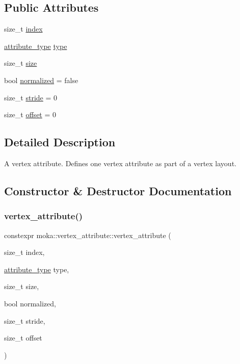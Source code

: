\subsection*{Public Attributes}
\begin{DoxyCompactItemize}
\item 
size\+\_\+t \mbox{\hyperlink{structmoka_1_1vertex__attribute_aabe27b67bd411d2845eae8d096d6547c}{index}}
\item 
\mbox{\hyperlink{namespacemoka_a1fe222f346eb65977e1069323023faa5}{attribute\+\_\+type}} \mbox{\hyperlink{structmoka_1_1vertex__attribute_aa8607ca1afa2836266900168844b6034}{type}}
\item 
size\+\_\+t \mbox{\hyperlink{structmoka_1_1vertex__attribute_a12e35fefbda322f7630d6366620ec6e5}{size}}
\item 
bool \mbox{\hyperlink{structmoka_1_1vertex__attribute_ab9bafa137212fbb874ac113f29297c8e}{normalized}} = false
\item 
size\+\_\+t \mbox{\hyperlink{structmoka_1_1vertex__attribute_ac14a60d2a9728b757d1b0f0bd09cbaa8}{stride}} = 0
\item 
size\+\_\+t \mbox{\hyperlink{structmoka_1_1vertex__attribute_a373fa56e1d1739964eb12c809a80f358}{offset}} = 0
\end{DoxyCompactItemize}


\subsection{Detailed Description}
A vertex attribute. Defines one vertex attribute as part of a vertex layout. 

\subsection{Constructor \& Destructor Documentation}
\mbox{\label{structmoka_1_1vertex__attribute_aa03afd5611da669788f8a779587708c2}} 
\subsubsection{\texorpdfstring{vertex\_attribute()}{vertex\_attribute()}}
{\footnotesize\ttfamily constexpr moka\+::vertex\+\_\+attribute\+::vertex\+\_\+attribute (\begin{DoxyParamCaption}\item[{size\+\_\+t}]{index,  }\item[{\mbox{\hyperlink{namespacemoka_a1fe222f346eb65977e1069323023faa5}{attribute\+\_\+type}}}]{type,  }\item[{size\+\_\+t}]{size,  }\item[{bool}]{normalized,  }\item[{size\+\_\+t}]{stride,  }\item[{size\+\_\+t}]{offset }\end{DoxyParamCaption})\hspace{0.3cm}{\ttfamily [noexcept]}}



